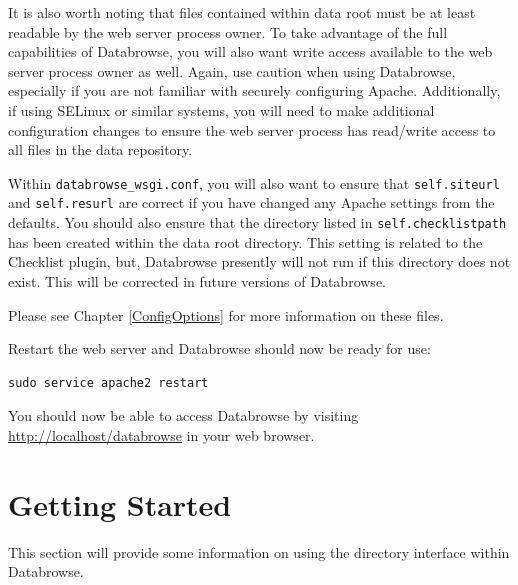 \documentclass[10pt]{article}
\begin{document}
It is also worth noting that files contained within data root must be at least readable by the web server process owner.  To take advantage of the full capabilities of Databrowse, you will also want write access available to the web server process owner as well.  Again, use caution when using Databrowse, especially if you are not familiar with securely configuring Apache.  Additionally, if using SELinux or similar systems, you will need to make additional configuration changes to ensure the web server process has read/write access to all files in the data repository.

Within \texttt{databrowse\_wsgi.conf}, you will also want to ensure that \texttt{self.siteurl} and \texttt{self.resurl} are correct if you have changed any Apache settings from the defaults.  You should also ensure that the directory listed in \texttt{self.checklistpath} has been created within the data root directory.  This setting is related to the Checklist plugin, but, Databrowse presently will not run if this directory does not exist.  This will be corrected in future versions of Databrowse.

Please see Chapter \ref{ConfigOptions} for more information on these files.

Restart the web server and Databrowse should now be ready for use:

\begin{verbatim}
sudo service apache2 restart
\end{verbatim}

You should now be able to access Databrowse by visiting \url{http://localhost/databrowse} in your web browser.

\clearpage
\section{Getting Started}\label{GettingStarted}

This section will provide some information on using the directory interface within Databrowse.
\end{document}

